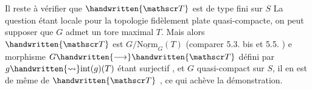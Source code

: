 Il reste à vérifier que $\handwritten{\mathscr T}$ est  de type fini sur $S$ La question étant locale pour la topologie fidèlement plate quasi-compacte, on peut supposer que $G$ admet un tore maximal $T$. Mais alors $\handwritten{\mathscr T}$  est   $G/\underline{\mathrm{Norm}}_G(T)$ (comparer  5.3. bis et 5.5. )  e morphisme $G\handwritten{\longrightarrow}\handwritten{\mathscr T}$ défini par $g\handwritten{\leadsto}\mathrm{int}(g)(T)$ étant surjectif , et $G$ quasi-compact sur $S$, il en est de même de $\handwritten{\mathscr T}$ , ce qui achève la démonstration.

